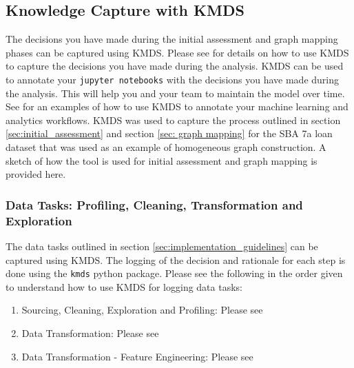 \documentclass{article}
\begin{document}
\subsection{Knowledge Capture with KMDS} \label{sec:kmds_logging}
The decisions you have made during the initial assessment and graph mapping phases can be captured using KMDS. Please see \href{https://github.com/rajivsam/KMDS/blob/main/feature_documentation/km_app_pipeline.md}{\cite{appworkflowKMDS}} for details on how to use KMDS to capture the decisions you have made during the analysis. KMDS can be used to annotate your \texttt{jupyter notebooks} with the decisions you have made during the analysis. This will help you and your team to maintain the model over time. See \href{https://github.com/rajivsam/kmds_recipes/wiki/Baseline-Data-Quality-Report}{\cite{kmds_recipes}} for an examples of how to use KMDS to annotate your machine learning and analytics workflows. KMDS was used to capture the process outlined in section \ref{sec:initial_assessment} and section \ref{sec: graph mapping} for the SBA 7a loan dataset that was used as an example of homogeneous graph construction. A sketch of how the tool is used for initial assessment and graph mapping is provided here.

\subsubsection{Data Tasks: Profiling, Cleaning, Transformation and Exploration}
The data tasks outlined in section \ref{sec:implementation_guidelines} can be captured using KMDS. The logging of the decision and rationale for each step is done using the \texttt{kmds} python package. Please see the following in the order given to understand how to use KMDS for logging data tasks:
\begin{enumerate}
    \item Sourcing, Cleaning, Exploration and Profiling: Please see \href{https://github.com/rajivsam/descriptive_analytics/blob/main/notebooks/sba_loans.ipynb}{\cite{sba_loans_init_assement}}
    \item Data Transformation: Please see \href{https://github.com/rajivsam/descriptive_analytics/blob/main/notebooks/sba_loan_numeric_enc.ipynb}{\cite{sba_dataset_encoding_data_trans}}
    \item Data Transformation - Feature Engineering: Please see \href{https://github.com/rajivsam/descriptive_analytics/blob/main/notebooks/sba_bad_borr_graph_ctor.ipynb}{\cite{sba_loans_feature_engg}}
\end{enumerate}
\end{document}

